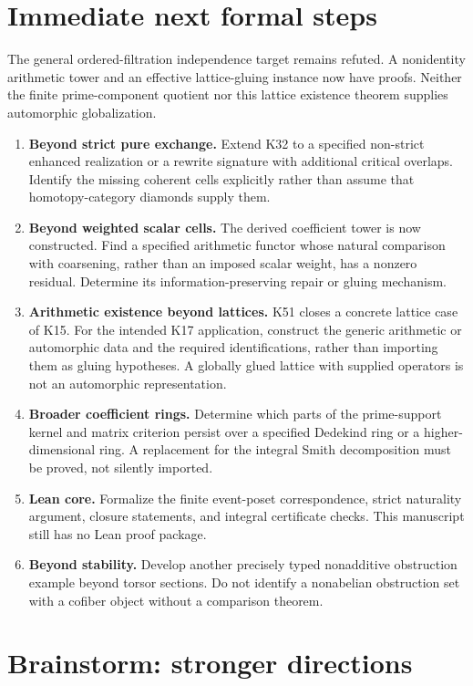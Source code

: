 \documentclass[11pt]{article}
\theoremstyle{definition}
\theoremstyle{remark}
\begin{document}
\section{Immediate next formal steps}

The general ordered-filtration independence target remains refuted. A nonidentity arithmetic tower and an effective lattice-gluing instance now have proofs. Neither the finite prime-component quotient nor this lattice existence theorem supplies automorphic globalization.

\begin{enumerate}
\item \textbf{Beyond strict pure exchange.} Extend K32 to a specified non-strict enhanced realization or a rewrite signature with additional critical overlaps. Identify the missing coherent cells explicitly rather than assume that homotopy-category diamonds supply them.
\item \textbf{Beyond weighted scalar cells.} The derived coefficient tower is now constructed. Find a specified arithmetic functor whose natural comparison with coarsening, rather than an imposed scalar weight, has a nonzero residual. Determine its information-preserving repair or gluing mechanism.
\item \textbf{Arithmetic existence beyond lattices.} K51 closes a concrete lattice case of K15. For the intended K17 application, construct the generic arithmetic or automorphic data and the required identifications, rather than importing them as gluing hypotheses. A globally glued lattice with supplied operators is not an automorphic representation.
\item \textbf{Broader coefficient rings.} Determine which parts of the prime-support kernel and matrix criterion persist over a specified Dedekind ring or a higher-dimensional ring. A replacement for the integral Smith decomposition must be proved, not silently imported.
\item \textbf{Lean core.} Formalize the finite event-poset correspondence, strict naturality argument, closure statements, and integral certificate checks. This manuscript still has no Lean proof package.
\item \textbf{Beyond stability.} Develop another precisely typed nonadditive obstruction example beyond torsor sections. Do not identify a nonabelian obstruction set with a cofiber object without a comparison theorem.
\end{enumerate}

\section{Brainstorm: stronger directions}
\end{document}
